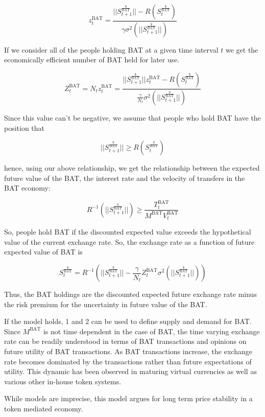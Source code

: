 \documentclass[11pt]{article}
\begin{document}
\[ z^{\textrm{BAT}}_{t} =\frac{||S^{\frac{\$}{\textrm{BAT}}}_{t+1}|| -R( S^{\frac{\$}{\textrm{BAT}}}_{t})}{ \gamma \sigma^{2}(||S^{\frac{\$}{\textrm{BAT}}}_{t+1}||) } \]

If we consider all of the people holding \textrm{BAT} at a given time interval $t$
we get the economically efficient number of \textrm{BAT} held for later use.

\[ Z^{\textrm{BAT}}_{t} = N_{t} z^{\textrm{BAT}}_{t} =\frac{||S^{\frac{\$}{\textrm{BAT}}}_{t+1}|| z^{\textrm{BAT}}_{t} -R(S^{\frac{\$}{\textrm{BAT}}}_{t})}{ \frac{\gamma}{N_{t}} \sigma^{2}(||S^{\frac{\$}{\textrm{BAT}}}_{t+1}||) } \]

Since this value can't be negative, we assume that people who hold \textrm{BAT}
have the position that

\[ ||S^{\frac{\$}{\textrm{BAT}}}_{t+1}|| \geq R( S^{\frac{\$}{\textrm{BAT}}}_{t})\]

hence, using our above relationship, we get the relationship between the expected future value of the \textrm{BAT}, the interest rate and the velocity of transfers in the \textrm{BAT} economy:

\[R^{-1} (||S^{\frac{\$}{\textrm{BAT}}}_{t+1}||) \geq \frac{T^{\textrm{BAT}}_{t}}{M^{\textrm{BAT}} V^{\textrm{BAT}}_{t}} \]

So, people hold \textrm{BAT} if the discounted expected value exceeds the
hypothetical value of the current exchange rate. So, the exchange rate
as a function of future expected value of \textrm{BAT} is

\[\tag{2} S^{\frac{\$}{\textrm{BAT}}}_{t} = R^{-1} (||S^{\frac{\$}{\textrm{BAT}}}_{t+1}|| -\frac{\gamma}{N_t}Z^{\textrm{BAT}}_{t} \sigma^{2}(||S^{\frac{\$}{\textrm{BAT}}}_{t+1} ||) )\]
    
Thus, the \textrm{BAT} holdings are the discounted expected future exchange
rate minus the risk premium for the uncertainty in future value of the
\textrm{BAT}.

If the model holds, {1} and {2} can be used to define supply and
demand for \textrm{BAT}. Since $M^{\textrm{BAT}}$ is not time dependent in the case of \textrm{BAT}, the
time varying exchange rate can be readily understood in terms of \textrm{BAT}
transactions and opinions on future utility of \textrm{BAT} transactions. As
\textrm{BAT} transactions increase, the exchange rate becomes dominated by the
transactions rather than future expectations of utility. This dynamic
has been observed in maturing virtual currencies as well as various
other in-house token systems.

While models are imprecise, this model argues for long term price
stability in a token mediated economy. 

\printbibliography

\vspace*{\fill}

\begin{flushright}

\pdfcreationdate
\end{flushright}
\end{document}
